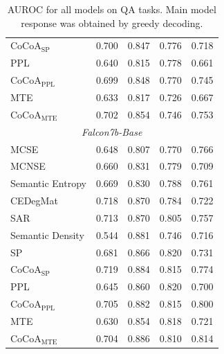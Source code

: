 \documentclass[11pt]{article}
\begin{document}
\begin{table}[htbp]
{\begin{tabular}{l cccc}
CoCoA$_{\mathrm{SP}}$ & 0.700 & 0.847 & 0.776 & 0.718 \\
PPL & 0.640 & 0.815 & 0.778 & 0.661 \\
CoCoA$_{\mathrm{PPL}}$ & 0.699 & 0.848 & 0.770 & 0.745 \\
MTE & 0.633 & 0.817 & 0.726 & 0.667 \\
CoCoA$_{\mathrm{MTE}}$ & 0.702 & 0.854 & 0.746 & 0.753 \\
\midrule
\multicolumn{5}{c}{\textit{Falcon7b-Base}} \\
\midrule
MCSE & 0.648 & 0.807 & 0.770 & 0.766 \\
MCNSE & 0.660 & 0.831 & 0.779 & 0.709 \\
Semantic Entropy & 0.669 & 0.830 & 0.788 & 0.761 \\
CEDegMat & 0.718 & 0.870 & 0.784 & 0.722 \\
SAR & 0.713 & 0.870 & 0.805 & 0.757 \\
Semantic Density & 0.544 & 0.881 & 0.746 & 0.716 \\
SP & 0.681 & 0.866 & 0.820 & 0.731 \\
CoCoA$_{\mathrm{SP}}$ & 0.719 & 0.884 & 0.815 & 0.774 \\
PPL & 0.645 & 0.860 & 0.820 & 0.700 \\
CoCoA$_{\mathrm{PPL}}$ & 0.705 & 0.882 & 0.815 & 0.800 \\
MTE & 0.630 & 0.854 & 0.818 & 0.721 \\
CoCoA$_{\mathrm{MTE}}$ & 0.704 & 0.886 & 0.810 & 0.814 \\
\bottomrule
\end{tabular}%
}
\caption{AUROC for all models on QA tasks. Main model response was obtained by greedy decoding.}
\label{tab:cocoa_table16}
\end{table}
\end{document}
